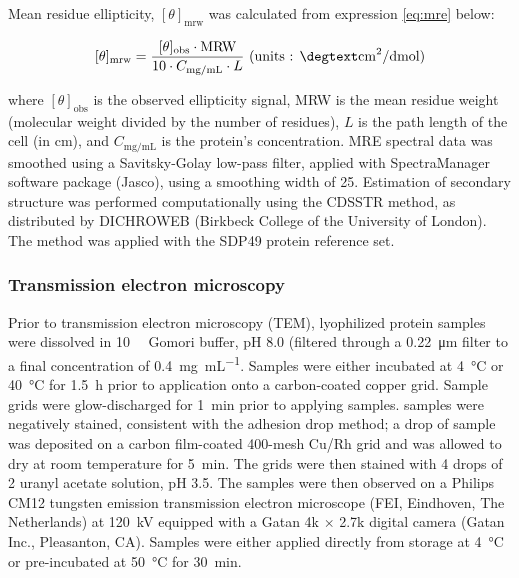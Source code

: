 \begin{refsection}
Mean residue ellipticity, $[\theta]_{\mathrm{mrw}}$ was calculated from
expression \ref{eq:mre} below:

\begin{equation}
    \label{eq:mre}
    [\theta]_{\text{mrw}}=
    \frac{[\theta]_{\text{obs}}\cdot\text{MRW}}{10\cdot{C_\text{mg/mL}}\cdot{L}}
    \text{ (units : \si{\degtext\cm\squared\per\deci\mol})}
\end{equation}

where $[\theta]_{\text{obs}}$ is the observed ellipticity signal, MRW is the
mean residue weight (molecular weight divided by the number of residues), $L$ is
the path length of the cell (in cm), and $C_\text{mg/mL}$ is the protein's
concentration.\cite{Martin2008} MRE spectral data was smoothed using a
Savitsky-Golay low-pass filter, applied with SpectraManager software package
(Jasco), using a smoothing width of 25.\cite{Savitzky1964} Estimation of
secondary structure was performed computationally using the CDSSTR method, as
distributed by DICHROWEB (Birkbeck College of the University of
London).\cite{Whitmore2008} The method was applied with the SDP49 protein
reference set.\cite{Sreerama2000a,Sreerama2000b}

\subsubsection{Transmission electron microscopy}
\label{sec:TEM_method}

Prior to transmission electron microscopy (TEM), lyophilized protein samples
were dissolved in \SI{10}{\milli\moLar} Gomori buffer, pH 8.0 (filtered through
a \SI{0.22}{\um} filter to a final concentration of \SI{0.4}{\mg\per\mL}.
Samples were either incubated at \SI{4}{\celsius} or \SI{40}{\celsius} for
\SI{1.5}{\hour} prior to application onto a carbon-coated copper grid. Sample
grids were glow-discharged for \SI{1}{\minute} prior to applying samples.
samples were negatively stained, consistent with the adhesion drop method; a
drop of sample was deposited on a carbon film-coated 400-mesh Cu/Rh grid and was
allowed to dry at room temperature for \SI{5}{\minute}. The grids were then
stained with 4 drops of \SI{2}{\volper} uranyl acetate solution, pH 3.5. The
samples were then observed on a Philips CM12 tungsten emission transmission
electron microscope (FEI, Eindhoven, The Netherlands) at \SI{120}{\kV} equipped
with a Gatan 4k ${\times}$ 2.7k digital camera (Gatan Inc., Pleasanton, CA).
Samples were either applied directly from storage at \SI{4}{\celsius} or
pre-incubated at \SI{50}{\celsius} for \SI{30}{\minute}.


\end{refsection}
